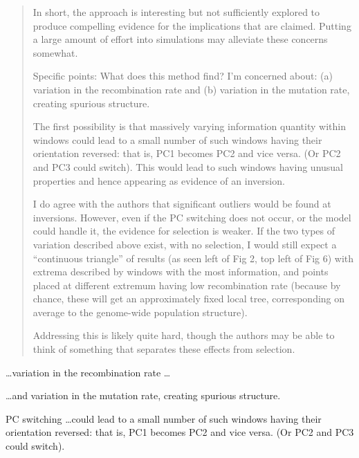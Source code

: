 \begin{quote}
    In short, the approach is interesting but not sufficiently explored to produce
    compelling evidence for the implications that are claimed.  Putting a large
    amount of effort into simulations may alleviate these concerns somewhat.

    Specific points: What does this method find? I'm concerned about:
    (a) variation in the recombination rate
    and (b) variation in the mutation rate, creating spurious structure.

    The first possibility is that massively varying information quantity
    within windows could lead to a small number of such windows having their
    orientation reversed: that is, PC1 becomes PC2 and vice versa. (Or PC2 and PC3
    could switch). This would lead to such windows having unusual properties and
    hence appearing as evidence of an inversion.

    I do agree with the authors that significant outliers would be found at
    inversions. However, even if the PC switching does not occur, or the model could
    handle it, the evidence for selection is weaker.  If the two types of variation
    described above exist, with no selection, I would still expect a ``continuous
    triangle'' of results (as seen left of Fig 2, top left of Fig 6) with extrema
    described by windows with the most information, and points placed at different
    extremum having low recombination rate (because by chance, these will get an
    approximately fixed local tree, corresponding on average to the genome-wide
    population structure).

    Addressing this is likely quite hard, though the authors may be able to think of
    something that separates these effects from selection.
\end{quote}


\begin{point}{}
\ldots variation in the recombination rate \ldots 
\end{point}

\begin{point}{}
\ldots and variation in the mutation rate, creating spurious structure.
\end{point}

\begin{point}{PC switching}
\ldots could lead to a small number of such windows having their
orientation reversed: that is, PC1 becomes PC2 and vice versa. (Or PC2 and PC3
could switch).
\end{point}


